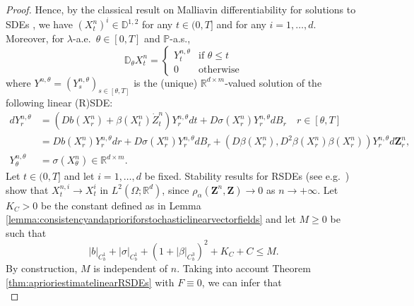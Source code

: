 \documentclass[11pt,a4paper]{article}
\newcommand{\R}{\mathbb{R}}
\theoremstyle{plain}
\begin{document}
\begin{proof}
{    Hence, by the classical result on Malliavin differentiability for solutions to SDEs \cite[Theorem 2.2.1]{nualart2006malliavin}, we have $(X^n_t)^i \in \mathbb{D}^{1,2}$ 
    for any $t \in (0,T]$ and for any $i=1,\dots,d$. 
    Moreover, for $\lambda$-a.e.\ $\theta \in [0,T]$ and $\mathbb{P}$-a.s., 
    \begin{equation*}
        \mathbb{D}_\theta X^n_t = \begin{cases}
            Y^{n,\theta}_t & \text{if $\theta \le t$} \\
            0 & \text{otherwise}
        \end{cases}
    \end{equation*} 
    where $Y^{n,\theta}=(Y^{n,\theta}_s)_{s   \in [\theta,T]}$ is the (unique) $\R^{d\times m}$-valued solution of the following linear (R)SDE: \begin{equation*} \label{eq:equationforY^n}\begin{aligned} dY^{n,\theta}_r& = (Db(X^n_r) + \beta(X^n_t) \dot{Z}^n_t) Y^{n,\theta}_r dt + D\sigma(X^n_r)Y^{n,\theta}_r dB_r \quad r \in [\theta,T] \\
    & =Db(X^n_r)Y^{n,\theta}_r dr+D\sigma(X^n_r)Y^{n,\theta}_r dB_r+(D\beta(X^n_r),D^2\beta(X^n_r)\beta(X^n_r))Y^{n,\theta}_r d\mathbf{Z}^n_r,  \\ Y^{n,\theta}_\theta &=\sigma(X^n_\theta) \in \R^{d\times m}. \end{aligned}
   \end{equation*}
   } 
   Let $t \in (0,T]$ and let $i=1,\dots,d$ be fixed.
    Stability results for RSDEs (see e.g.\ \cite[Theorem 4.9]{FHL21}) show that $X_t^{n,i} \to X_t^i$ in $L^2(\Omega;\R^d)$, since $\rho_\alpha(\mathbf{Z}^n,\mathbf{Z})\to 0$ as $n\to +\infty$. 
    Let $K_C>0$ be the constant defined as in Lemma \ref{lemma:consistencyandaprioriforstochasticlinearvectorfields} and let $M \ge 0$ be such that \begin{equation*}
        |b|_{{C}^1_b} + |\sigma|_{{C}^1_b} + (1+|\beta|_{{C}^3_b})^2 + K_C + C \le M.
    \end{equation*}
    By construction, $M$ is independent of $n$.
    Taking into account Theorem \ref{thm:aprioriestimatelinearRSDEs} with $F \equiv 0$, we can infer that 
    \begin{equation*}

\end{equation*}
\end{proof}
\end{document}
